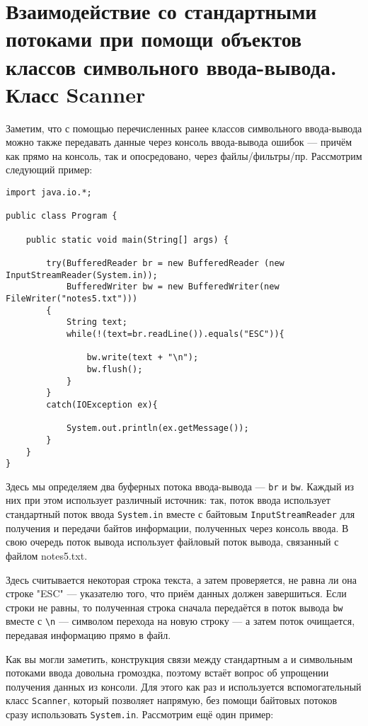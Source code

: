 \section{Взаимодействие со стандартными потоками при помощи объектов классов символьного ввода-вывода. Класс Scanner}

Заметим, что с помощью перечисленных ранее классов символьного ввода-вывода можно также передавать данные через консоль ввода-вывода ошибок — причём как прямо на консоль, так и опосредовано, через файлы/фильтры/пр. Рассмотрим следующий пример:

\begin{lstlisting}
import java.io.*;
 
public class Program {
 
    public static void main(String[] args) {
         
        try(BufferedReader br = new BufferedReader (new InputStreamReader(System.in)); 
            BufferedWriter bw = new BufferedWriter(new FileWriter("notes5.txt")))
        {
            String text;
            while(!(text=br.readLine()).equals("ESC")){
                  
                bw.write(text + "\n");
                bw.flush();
            }
        }
        catch(IOException ex){
              
            System.out.println(ex.getMessage());
        } 
    }   
}
\end{lstlisting}

Здесь мы определяем два буферных потока ввода-вывода — \verb|br| и \verb|bw|. Каждый из них при этом использует различный источник: так, поток ввода использует стандартный поток ввода \verb|System.in| вместе с байтовым \verb|InputStreamReader| для получения и передачи байтов информации, полученных через консоль ввода. В свою очередь поток вывода использует файловый поток вывода, связанный с файлом notes5.txt.

Здесь считывается некоторая строка текста, а затем проверяется, не равна ли она строке "ESC" — указателю того, что приём данных должен завершиться. Если строки не равны, то полученная строка сначала передаётся в поток вывода \verb|bw| вместе с \verb|\n| — символом перехода на новую строку — а затем поток очищается, передавая информацию прямо в файл.

Как вы могли заметить, конструкция связи между стандартным а и символьным потоками ввода довольна громоздка, поэтому встаёт вопрос об упрощении получения данных из консоли. Для этого как раз и используется вспомогательный класс \verb|Scanner|, который позволяет напрямую, без помощи байтовых потоков сразу использовать \verb|System.in|. Рассмотрим ещё один пример:


